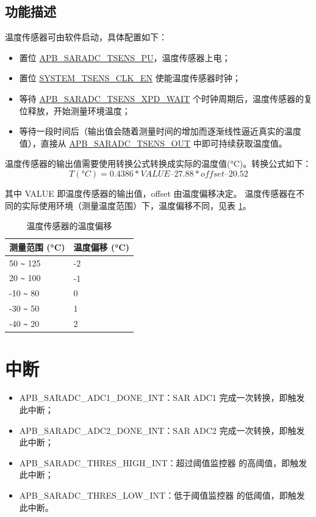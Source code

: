 \documentclass[main\_\_CN.tex]{subfiles}
\begin{document}
\subsection{功能描述}

温度传感器可由软件启动，具体配置如下：
    \begin{itemize}
        \item 置位 \hyperref[fielddesc:APBSARADCTSENSPU]{APB\_SARADC\_TSENS\_PU}，温度传感器上电；
        \item 置位 \hyperref[fielddesc:SYSTEMTSENSCLKEN]{SYSTEM\_TSENS\_CLK\_EN} 使能温度传感器时钟；
        \item 等待 \hyperref[fielddesc:APBSARADCTSENSXPDWAIT]{APB\_SARADC\_TSENS\_XPD\_WAIT} 个时钟周期后，温度传感器的复位释放，开始测量环境温度；
        \item 等待一段时间后（输出值会随着测量时间的增加而逐渐线性逼近真实的温度值），直接从 \hyperref[fielddesc:APBSARADCTSENSOUT]{APB\_SARADC\_TSENS\_OUT} 中即可持续获取温度值。
    \end{itemize}



温度传感器的输出值需要使用转换公式转换成实际的温度值(°C)。转换公式如下： 
\[
        T(°C) = 0.4386 * VALUE – 27.88 * offset – 20.52
\]


其中 VALUE 即温度传感器的输出值，offset 由温度偏移决定。 温度传感器在不同的实际使用环境（测量温度范围）下，温度偏移不同，见表 \ref{tab:tsensor-dac}。


\begin{longtable}[c]{|p{4cm}|p{4cm}|}
    \caption{温度传感器的温度偏移}
    \label{tab:tsensor-dac}
    \\\hline
    \rowcolor{lightgray}
    测量范围 (°C)  & 温度偏移 (°C) \\\hline
    50 \verb+~+ 125 & -2 \\\hline
    20 \verb+~+ 100 & -1 \\\hline
    -10 \verb+~+ 80 & 0 \\\hline
    -30 \verb+~+ 50 & 1 \\\hline
    -40 \verb+~+ 20 & 2 \\\hline
\end{longtable}

\section{中断}

\begin{itemize}
   \item \label{int:SARADCDONEINT1} APB\_SARADC\_ADC1\_DONE\_INT：SAR ADC1 完成一次转换，即触发此中断；
   \item \label{int:SARADCDONEINT2} APB\_SARADC\_ADC2\_DONE\_INT：SAR ADC2 完成一次转换，即触发此中断；
   \item \label{int:APBSARADCTHRESxHIGHINT} APB\_SARADC\_THRES\_HIGH\_INT：超过阈值监控器  的高阈值，即触发此中断；
    \item \label{int:APBSARADCTHRESxLOWINT} APB\_SARADC\_THRES\_LOW\_INT：低于阈值监控器  的低阈值，即触发此中断。
\end{itemize}
\end{document}
